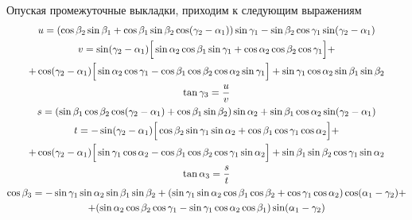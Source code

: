 \documentclass[14pt]{extarticle}
\newcommand{\ao}{\alpha_1}
\newcommand{\bo}{\beta_1}
\newcommand{\go}{\gamma_1}
\newcommand{\at}{\alpha_2}
\newcommand{\bt}{\beta_2}
\newcommand{\gt}{\gamma_2}
\newcommand{\ath}{\alpha_3}
\newcommand{\bth}{\beta_3}
\newcommand{\gth}{\gamma_3}
\begin{document}
Опуская промежуточные выкладки, приходим к следующим выражениям
\begin{gather}
	u = (\cos \bt \sin \bo + \cos \bo \sin \bt \cos ( \gt - \ao) ) \sin \go - \sin \bt \cos \go \sin(\gt - \ao) \notag \\
	v = \sin (\gt - \ao) \Big[ \sin \at \cos \bo \sin \go + \cos \at \cos \bt \cos \go \Big] + \notag \\
	+ \cos (\gt - \ao) \Big[ \sin \at \cos \go - \cos \bo \cos \bt \cos \at \sin \go \Big] + \sin \go \cos \at \sin \bo \sin \bt \notag \\
	\tan \gth = \frac{u}{v} \notag \\
	s = ( \sin \bo \cos \bt \cos ( \gt - \ao ) + \cos \bo \sin \bt ) \sin \at + \sin \bo \cos \at \sin ( \gt - \ao ) \notag \\
	t = - \sin ( \gt - \ao) \Big[ \cos \bt \sin \go \sin \at + \cos \bo \cos \go \cos \at \Big] + \notag \\
	+ \cos ( \gt - \ao ) \Big[ \sin \go \cos \at - \cos \bo \cos \bt \cos \go \sin \at \Big] +  \sin \bo \sin \bt \cos \go \sin \at \notag \\
	\tan \ath = \frac{s}{t} \notag \\
	\cos \bth = - \sin \go \sin \at \sin \bo \sin \bt + (\sin \go \sin \at \cos \bo \cos \bt + \cos \go \cos \at) \cos (\ao - \gt) + \notag \\
	+ (\sin \at \cos \bt \cos \go - \sin \go \cos \at \cos \bo) \sin (\ao - \gt) \notag
\end{gather}
\end{document}
